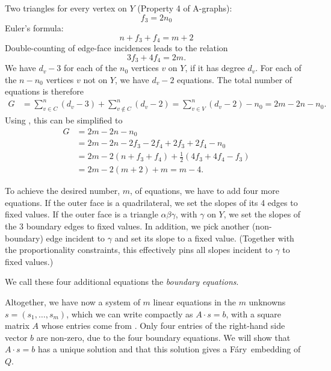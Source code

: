 \documentclass{patmorin}
\newcommand{\Fary}{Fáry}
\begin{document}
Two triangles for every vertex on $Y$ (Property 4 of A-graphs):
\begin{equation}
  \label{eq:f3}
  f_3 = 2n_0
\end{equation}
Euler's formula:
\begin{equation}
  \label{eq:Euler}
  n + f_3+f_4 = m+2
\end{equation}
Double-counting of edge-face incidences leads to the relation
\begin{equation}
  \label{eq:edge-face}
  3f_3+4f_4=2m.
\end{equation}
We have $d_v-3$ for each of the $n_0$ vertices $v$ on $Y$, if it has
degree $d_v$. For each of the 
 $n-n_0$ vertices $v$ not on $Y$, 
we have $d_v-2$ equations.
  The total number of equations is therefore
  \begin{align*}
G &= 
\sum_{v\in C}^n(d_v-3)+
\sum_{v\notin C}^n(d_v-2)
=
\sum_{v\in V}^n(d_v-2)-n_0
=
2m-2n-n_0.
  \end{align*}
Using \thetag{\ref{eq:f3}--\ref{eq:edge-face}}, this can be
simplified to
\begin{align*}
G&=
2m-2n-n_0\\
&= 2m -2n -2f_3-2f_4 +2f_3+2f_4-n_0\\
&= 2m -2(n +f_3+f_4) +\tfrac12(4f_3+4f_4-f_3)\\
&= 2m -2(m+2) +m = m-4.
\end{align*}

To achieve the desired number, $m$, of equations, we have to add four
more equations.
If the outer face is a quadrilateral, we set the slopes of its
 4 edges
to fixed values.
If the outer face is a triangle $\alpha\beta\gamma$, with $\gamma$ on
$Y$, we set the slopes of the 3 boundary edges
to fixed values. In addition, we pick another (non-boundary) edge
incident to $\gamma$ and set its slope to a fixed value.
(Together with the proportionality constraints, this effectively pins
all slopes
incident to $\gamma$ to fixed values.)

We call these four additional equations the \emph{boundary equations}.

Altogether, we have now a system of $m$ linear equations
in the $m$ unknowns $s=(s_1,\ldots,s_m)$, which we can write
compactly as
 $A\cdot s = b$, with a square matrix $A$ whose entries come from
 \thetag{\ref{eq:slope0}--\ref{eq:proportion2}}.
Only four entries of
the right-hand side vector
 $b$
are non-zero, due to the four boundary equations.
We will show that $A\cdot s=b$ has a unique
solution and that this solution gives a \Fary\ embedding of $Q$.
\end{document}
